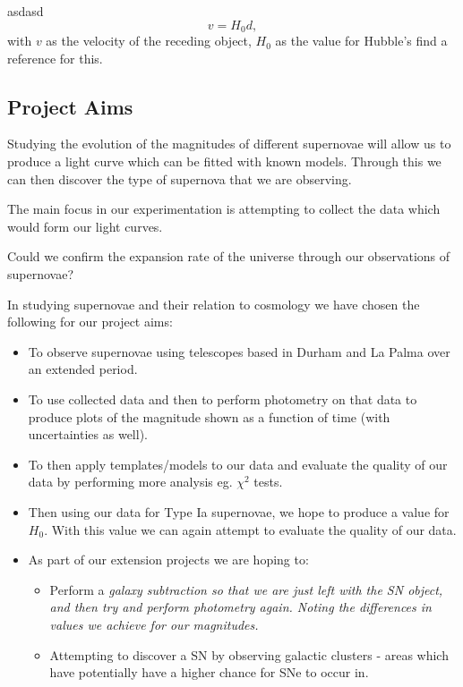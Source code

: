 \documentclass[twocolumn]{revtex4}
\begin{document}
asdasd \cite{abs_phil}
\begin{equation}
v = H_0 d, 
\end{equation}
with $v$ as the velocity of the receding object, $H_0$ as the value for Hubble's 
find a reference for this.

\vspace{-3ex}
\subsection{Project Aims}
\vspace{-2ex}

Studying the evolution of the magnitudes of different supernovae will allow us to produce a light curve which can be fitted with known models. Through this we can then discover the type of supernova that we are observing. 

The main focus in our experimentation is attempting to collect the data which would form our light curves. 

Could we confirm the expansion rate of the universe through our observations of supernovae? 

In studying supernovae and their relation to cosmology we have chosen the following for our project aims:
\begin{itemize}
 \item To observe supernovae using telescopes based in Durham and La Palma over an extended period.
 \item To use collected data and then to perform photometry on that data to produce plots of the magnitude shown as a function of time (with uncertainties as well).
 \item To then apply templates/models to our data and evaluate the quality of our data by performing more analysis eg. $\chi^2$ tests.
 \item Then using our data for Type Ia supernovae, we hope to produce a value for $H_0$. With this value we can again attempt to evaluate the quality of our data.
 \item As part of our extension projects we are hoping to:
 \begin{itemize}
  \item Perform a \em{galaxy subtraction }\em so that we are just left with the SN object, and then try and perform photometry again. Noting the differences in values we achieve for our magnitudes.
  \item Attempting to discover a SN by observing galactic clusters - areas which have potentially have a higher chance for SNe to occur in.
 \end{itemize}
\end{itemize}
\end{document}
